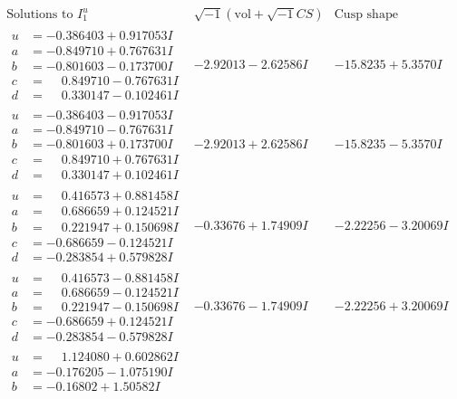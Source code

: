 \documentclass[1p]{elsarticle_modified}
\theoremstyle{definition}
\newcommand{\I}{\sqrt{-1}}
\begin{document}
$$\begin{array}{c|c|c}  
\text{Solutions to }I^u_{1}& \I (\text{vol} + \sqrt{-1}CS) & \text{Cusp shape}\\
 \hline 
\begin{aligned}
u &= -0.386403 + 0.917053 I \\
a &= -0.849710 + 0.767631 I \\
b &= -0.801603 - 0.173700 I \\
c &= \phantom{-}0.849710 - 0.767631 I \\
d &= \phantom{-}0.330147 - 0.102461 I\end{aligned}
 & -2.92013 - 2.62586 I & -15.8235 + 5.3570 I \\ \hline\begin{aligned}
u &= -0.386403 - 0.917053 I \\
a &= -0.849710 - 0.767631 I \\
b &= -0.801603 + 0.173700 I \\
c &= \phantom{-}0.849710 + 0.767631 I \\
d &= \phantom{-}0.330147 + 0.102461 I\end{aligned}
 & -2.92013 + 2.62586 I & -15.8235 - 5.3570 I \\ \hline\begin{aligned}
u &= \phantom{-}0.416573 + 0.881458 I \\
a &= \phantom{-}0.686659 + 0.124521 I \\
b &= \phantom{-}0.221947 + 0.150698 I \\
c &= -0.686659 - 0.124521 I \\
d &= -0.283854 + 0.579828 I\end{aligned}
 & -0.33676 + 1.74909 I & -2.22256 - 3.20069 I \\ \hline\begin{aligned}
u &= \phantom{-}0.416573 - 0.881458 I \\
a &= \phantom{-}0.686659 - 0.124521 I \\
b &= \phantom{-}0.221947 - 0.150698 I \\
c &= -0.686659 + 0.124521 I \\
d &= -0.283854 - 0.579828 I\end{aligned}
 & -0.33676 - 1.74909 I & -2.22256 + 3.20069 I \\ \hline\begin{aligned}
u &= \phantom{-}1.124080 + 0.602862 I \\
a &= -0.176205 - 1.075190 I \\
b &= -0.16802 + 1.50582 I \\

\end{aligned}
\end{array}$$
\end{document}
